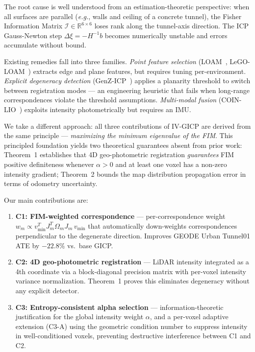 \documentclass[letterpaper, 10pt, conference]{ieeeconf}
\newcommand{\vmin}{v_{\min}}
\newcommand{\FIM}{\mathcal{I}}
\newcommand{\eg}{\textit{e.g.}}
\begin{document}
The root cause is well understood from an estimation-theoretic perspective:
when all surfaces are parallel (\eg, walls and ceiling of a concrete tunnel),
the Fisher Information Matrix $\FIM \in \mathbb{R}^{6\times6}$ loses rank along
the tunnel-axis direction.
The ICP Gauss-Newton step $\Delta\xi = -H^{-1}b$ becomes numerically unstable
and errors accumulate without bound.

Existing remedies fall into three families.
\textit{Point feature selection} (LOAM~\cite{zhang2014loam}, LeGO-LOAM~\cite{shan2018lego})
extracts edge and plane features, but requires tuning per-environment.
\textit{Explicit degeneracy detection} (GenZ-ICP~\cite{zhang2024genz}) applies a
planarity threshold to switch between registration modes — an engineering heuristic
that fails when long-range correspondences violate the threshold assumptions.
\textit{Multi-modal fusion} (COIN-LIO~\cite{pfreundschuh2024coinlio}) exploits
intensity photometrically but requires an IMU.

We take a different approach: all three contributions of IV-GICP are derived from
the same principle — \textit{maximizing the minimum eigenvalue of the FIM}.
This principled foundation yields two theoretical guarantees absent from prior work:
Theorem~1 establishes that 4D geo-photometric registration \emph{guarantees}
FIM positive definiteness whenever $\alpha > 0$ and at least one voxel has a
non-zero intensity gradient; Theorem~2 bounds the map distribution propagation
error in terms of odometry uncertainty.

Our main contributions are:
\begin{enumerate}
\item \textbf{C1: FIM-weighted correspondence} — per-correspondence weight
  $w_m \propto \vmin^T J_m^T\Omega_m J_m\, \vmin$ that automatically
  down-weights correspondences perpendicular to the degenerate direction.
  Improves GEODE Urban Tunnel01 ATE by $\mathbf{-22.8\%}$ vs.\ base GICP.

\item \textbf{C2: 4D geo-photometric registration} — LiDAR intensity integrated
  as a 4th coordinate via a block-diagonal precision matrix with per-voxel
  intensity variance normalization.
  Theorem~1 proves this eliminates degeneracy without any explicit detector.

\item \textbf{C3: Entropy-consistent alpha selection} — information-theoretic
  justification for the global intensity weight $\alpha$, and a per-voxel
  adaptive extension (C3-A) using the geometric condition number to suppress
  intensity in well-conditioned voxels, preventing destructive interference
  between C1 and C2.
\end{enumerate}
\end{document}
